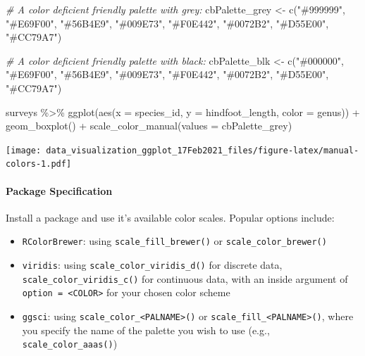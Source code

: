 \documentclass[
]{article}
\newenvironment{Shaded}{\begin{snugshade}}{\end{snugshade}}
\newcommand{\AttributeTok}[1]{\textcolor[rgb]{0.77,0.63,0.00}{#1}}
\newcommand{\CommentTok}[1]{\textcolor[rgb]{0.56,0.35,0.01}{\textit{#1}}}
\newcommand{\FunctionTok}[1]{\textcolor[rgb]{0.00,0.00,0.00}{#1}}
\newcommand{\NormalTok}[1]{#1}
\newcommand{\OtherTok}[1]{\textcolor[rgb]{0.56,0.35,0.01}{#1}}
\newcommand{\SpecialCharTok}[1]{\textcolor[rgb]{0.00,0.00,0.00}{#1}}
\newcommand{\StringTok}[1]{\textcolor[rgb]{0.31,0.60,0.02}{#1}}
\begin{document}
\begin{Shaded}
\begin{Highlighting}[]
\CommentTok{\# A color deficient friendly palette with grey:}
\NormalTok{cbPalette\_grey }\OtherTok{\textless{}{-}} \FunctionTok{c}\NormalTok{(}\StringTok{"\#999999"}\NormalTok{, }\StringTok{"\#E69F00"}\NormalTok{, }\StringTok{"\#56B4E9"}\NormalTok{, }\StringTok{"\#009E73"}\NormalTok{, }\StringTok{"\#F0E442"}\NormalTok{, }
                    \StringTok{"\#0072B2"}\NormalTok{, }\StringTok{"\#D55E00"}\NormalTok{, }\StringTok{"\#CC79A7"}\NormalTok{)}

\CommentTok{\# A color deficient friendly palette with black:}
\NormalTok{cbPalette\_blk }\OtherTok{\textless{}{-}} \FunctionTok{c}\NormalTok{(}\StringTok{"\#000000"}\NormalTok{, }\StringTok{"\#E69F00"}\NormalTok{, }\StringTok{"\#56B4E9"}\NormalTok{, }\StringTok{"\#009E73"}\NormalTok{, }\StringTok{"\#F0E442"}\NormalTok{, }
                   \StringTok{"\#0072B2"}\NormalTok{, }\StringTok{"\#D55E00"}\NormalTok{, }\StringTok{"\#CC79A7"}\NormalTok{)}

\NormalTok{surveys }\SpecialCharTok{\%\textgreater{}\%} 
  \FunctionTok{ggplot}\NormalTok{(}\FunctionTok{aes}\NormalTok{(}\AttributeTok{x =}\NormalTok{ species\_id, }\AttributeTok{y =}\NormalTok{ hindfoot\_length, }\AttributeTok{color =}\NormalTok{ genus)) }\SpecialCharTok{+}
  \FunctionTok{geom\_boxplot}\NormalTok{() }\SpecialCharTok{+}
  \FunctionTok{scale\_color\_manual}\NormalTok{(}\AttributeTok{values =}\NormalTok{ cbPalette\_grey)}
\end{Highlighting}
\end{Shaded}

\texttt{[image: data\_visualization\_ggplot\_17Feb2021\_files/figure-latex/manual-colors-1.pdf]}

\hypertarget{package-specification}{%
\paragraph{Package Specification}\label{package-specification}}

Install a package and use it's available color scales. Popular options
include:

\begin{itemize}
\item
  \texttt{RColorBrewer}: using \texttt{scale\_fill\_brewer()} or
  \texttt{scale\_color\_brewer()}
\item
  \texttt{viridis}: using \texttt{scale\_color\_viridis\_d()} for
  discrete data, \texttt{scale\_color\_viridis\_c()} for continuous
  data, with an inside argument of
  \texttt{option\ =\ \textless{}COLOR\textgreater{}} for your chosen
  color scheme
\item
  \texttt{ggsci}: using
  \texttt{scale\_color\_\textless{}PALNAME\textgreater{}()} or
  \texttt{scale\_fill\_\textless{}PALNAME\textgreater{}()}, where you
  specify the name of the palette you wish to use (e.g.,
  \texttt{scale\_color\_aaas()})
\end{itemize}
\end{document}
